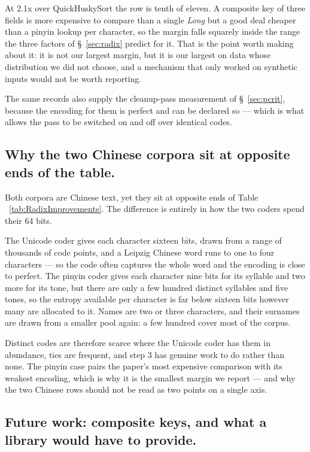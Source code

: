 \documentclass[twoside,leqno,twocolumn]{article}
\begin{document}
At 2.1x over QuickHuskySort the row is tenth of eleven.
A composite key of three fields is more expensive to compare than a single \textit{Long} but a good
deal cheaper than a pinyin lookup per character, so the margin falls squarely inside the range the
three factors of \S~\ref{sec:radix} predict for it.
That is the point worth making about it: it is not our largest margin, but it is our largest on data
whose distribution we did not choose, and a mechanism that only worked on synthetic inputs would not be
worth reporting.

The same records also supply the cleanup-pass measurement of \S~\ref{sec:pcrit},
because the encoding for them is perfect and can be declared so ---
which is what allows the pass to be switched on and off over identical codes.

\subsection{Why the two Chinese corpora sit at opposite ends of the table.}
\label{sec:chinese-coders}

Both corpora are Chinese text, yet they sit at opposite ends of Table
~\ref{tab:RadixImprovements}.
The difference is entirely in how the two coders spend their 64 bits.

The Unicode coder gives each character sixteen bits, drawn from a range of thousands of code points,
and a Leipzig Chinese word runs to one to four characters --- so the code often captures the whole word
and the encoding is close to perfect.
The pinyin coder gives each character nine bits for its syllable and two more for its tone, but there
are only a few hundred distinct syllables and five tones, so the entropy available per character is far
below sixteen bits however many are allocated to it.
Names are two or three characters, and their surnames are drawn from a smaller pool again: a few
hundred cover most of the corpus.

Distinct codes are therefore scarce where the Unicode coder has them in abundance, ties are frequent,
and step 3 has genuine work to do rather than none.
The pinyin case pairs the paper's most expensive comparison with its weakest encoding, which is why it
is the smallest margin we report --- and why the two Chinese rows should not be read as two points on a
single axis.

\subsection{Future work: composite keys, and what a library would have to provide.}
\label{sec:composite-future}
\end{document}

